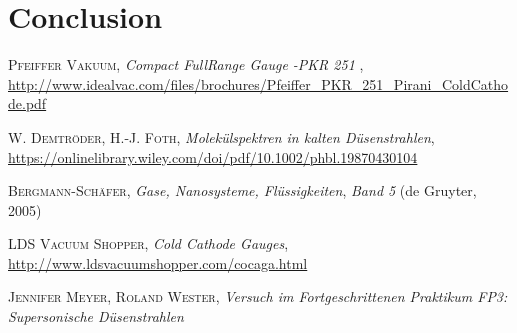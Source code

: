 \documentclass[a4paper,10pt]{article}
\begin{document}
\section{Conclusion}

\begin{thebibliography}{99}
\textsc{Pfeiffer Vakuum}, \textit{Compact FullRange Gauge -PKR 251 }, \url{http://www.idealvac.com/files/brochures/Pfeiffer_PKR_251_Pirani_ColdCathode.pdf}

\textsc{W. Demtröder, H.-J. Foth}, \textit{Molekülspektren in kalten Düsenstrahlen}, \url{https://onlinelibrary.wiley.com/doi/pdf/10.1002/phbl.19870430104}

\textsc{Bergmann-Schäfer}, \textit{Gase, Nanosysteme, Flüssigkeiten}, \textit{Band 5} (de Gruyter, 2005)

\textsc{LDS Vacuum Shopper}, \textit{Cold Cathode Gauges}, \url{http://www.ldsvacuumshopper.com/cocaga.html}

\textsc{Jennifer Meyer, Roland Wester}, \textit{Versuch im Fortgeschrittenen Praktikum FP3: Supersonische Düsenstrahlen}
\end{thebibliography}
\end{document}
